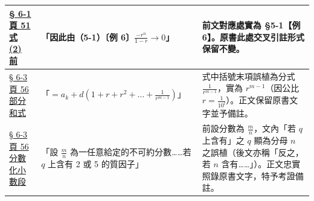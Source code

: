 \documentclass[a4paper,12pt,twoside]{article}
\begin{document}
\begin{table}[H]
\begin{tabularx}{\textwidth}{|p{3.2cm}|p{3.6cm}|X|}
\hyperref[note:b2-ch2-p51-lim-rn]{§ 6-1 頁 51 式 (2) 前} & 
「因此由（5-1）〔例 6〕$\frac{-r^n}{1-r} \to 0$」 & 
前文對應處實為 §5-1【例 6】。原書此處交叉引註形式保留不變。 \\ \hline

\hyperref[note:b2-ch2-p56-partial-sum-r]{§ 6-3 頁 56 部分和式} & 
「$= a_k + d(1+r+r^2+\dots+\frac{1}{r^{m-1}})$」 & 
式中括號末項誤植為分式 $\frac{1}{r^{m-1}}$，實為 $r^{m-1}$（因公比 $r=\frac{1}{10^l}$）。正文保留原書文字並予備註。 \\ \hline

\hyperref[note:b2-ch2-p56-q-typo]{§ 6-3 頁 56 分數化小數段} & 
「設 $\frac{m}{n}$ 為一任意給定的不可約分數……若 $q$ 上含有 2 或 5 的質因子」 & 
前設分數為 $\frac{m}{n}$，文內「若 $q$ 上含有」之 $q$ 顯為分母 $n$ 之誤植（後文亦稱「反之，若 $n$ 含有……」）。正文忠實照錄原書文字，特予考證備註。 \\ \hline

\end{tabularx}
\end{table}

\clearpage
\tableofcontents
\newpage


\end{document}
